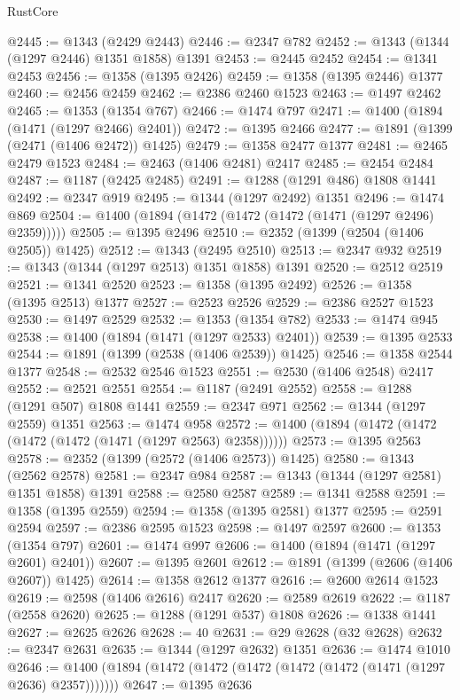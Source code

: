 \begin{lexlean}{RustCore}
\begin{coremodule}
@2445 := @1343 (@2429 @2443)
@2446 := @2347 @782
@2452 := @1343 (@1344 (@1297 @2446) @1351 @1858) @1391
@2453 := @2445 @2452
@2454 := @1341 @2453
@2456 := @1358 (@1395 @2426)
@2459 := @1358 (@1395 @2446) @1377
@2460 := @2456 @2459
@2462 := @2386 @2460 @1523
@2463 := @1497 @2462
@2465 := @1353 (@1354 @767)
@2466 := @1474 @797
@2471 := @1400 (@1894 (@1471 (@1297 @2466) @2401))
@2472 := @1395 @2466
@2477 := @1891 (@1399 (@2471 (@1406 @2472)) @1425)
@2479 := @1358 @2477 @1377
@2481 := @2465 @2479 @1523
@2484 := @2463 (@1406 @2481) @2417
@2485 := @2454 @2484
@2487 := @1187 (@2425 @2485)
@2491 := @1288 (@1291 @486) @1808 @1441
@2492 := @2347 @919
@2495 := @1344 (@1297 @2492) @1351
@2496 := @1474 @869
@2504 := @1400 (@1894 (@1472 (@1472 (@1472 (@1471 (@1297 @2496) @2359)))))
@2505 := @1395 @2496
@2510 := @2352 (@1399 (@2504 (@1406 @2505)) @1425)
@2512 := @1343 (@2495 @2510)
@2513 := @2347 @932
@2519 := @1343 (@1344 (@1297 @2513) @1351 @1858) @1391
@2520 := @2512 @2519
@2521 := @1341 @2520
@2523 := @1358 (@1395 @2492)
@2526 := @1358 (@1395 @2513) @1377
@2527 := @2523 @2526
@2529 := @2386 @2527 @1523
@2530 := @1497 @2529
@2532 := @1353 (@1354 @782)
@2533 := @1474 @945
@2538 := @1400 (@1894 (@1471 (@1297 @2533) @2401))
@2539 := @1395 @2533
@2544 := @1891 (@1399 (@2538 (@1406 @2539)) @1425)
@2546 := @1358 @2544 @1377
@2548 := @2532 @2546 @1523
@2551 := @2530 (@1406 @2548) @2417
@2552 := @2521 @2551
@2554 := @1187 (@2491 @2552)
@2558 := @1288 (@1291 @507) @1808 @1441
@2559 := @2347 @971
@2562 := @1344 (@1297 @2559) @1351
@2563 := @1474 @958
@2572 := @1400 (@1894 (@1472 (@1472 (@1472 (@1472 (@1471 (@1297 @2563) @2358))))))
@2573 := @1395 @2563
@2578 := @2352 (@1399 (@2572 (@1406 @2573)) @1425)
@2580 := @1343 (@2562 @2578)
@2581 := @2347 @984
@2587 := @1343 (@1344 (@1297 @2581) @1351 @1858) @1391
@2588 := @2580 @2587
@2589 := @1341 @2588
@2591 := @1358 (@1395 @2559)
@2594 := @1358 (@1395 @2581) @1377
@2595 := @2591 @2594
@2597 := @2386 @2595 @1523
@2598 := @1497 @2597
@2600 := @1353 (@1354 @797)
@2601 := @1474 @997
@2606 := @1400 (@1894 (@1471 (@1297 @2601) @2401))
@2607 := @1395 @2601
@2612 := @1891 (@1399 (@2606 (@1406 @2607)) @1425)
@2614 := @1358 @2612 @1377
@2616 := @2600 @2614 @1523
@2619 := @2598 (@1406 @2616) @2417
@2620 := @2589 @2619
@2622 := @1187 (@2558 @2620)
@2625 := @1288 (@1291 @537) @1808
@2626 := @1338 @1441
@2627 := @2625 @2626
@2628 := 40
@2631 := @29 @2628 (@32 @2628)
@2632 := @2347 @2631
@2635 := @1344 (@1297 @2632) @1351
@2636 := @1474 @1010
@2646 := @1400 (@1894 (@1472 (@1472 (@1472 (@1472 (@1472 (@1471 (@1297 @2636) @2357)))))))
@2647 := @1395 @2636

\end{coremodule}
\end{lexlean}
